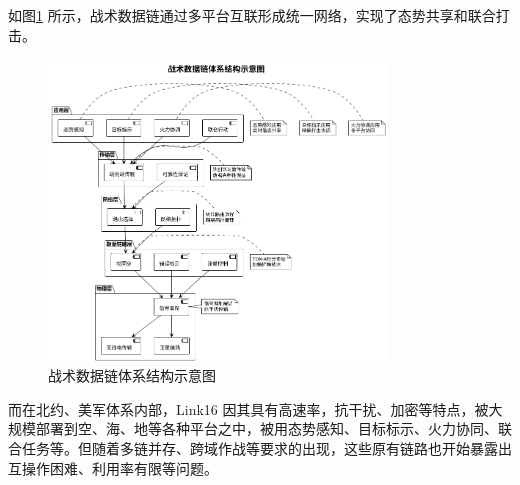\begin{table}[!htb]
    \caption{典型战术数据链对比}
    \label{table_tdl_compare}
    \centering
\end{table}

如图\ref{fig_tdl_architecture} 所示，战术数据链通过多平台互联形成统一网络，实现了态势共享和联合打击。

\begin{figure}[!htb]
    \centering
    \includegraphics[width=0.8\textwidth,height=0.5\textheight,keepaspectratio]{chapters/fig-0/tdl_architecture_simple.png}
    \caption{战术数据链体系结构示意图}
    \label{fig_tdl_architecture}
\end{figure}

而在北约、美军体系内部，{Link16} 因其具有高速率，抗干扰、加密等特点，被大规模部署到空、海、地等各种平台之中\cite{Ultra_ADSI_2023}，被用态势感知、目标标示、火力协同、联合任务等。但随着多链并存、跨域作战等要求的出现，这些原有链路也开始暴露出互操作困难、利用率有限等问题。


